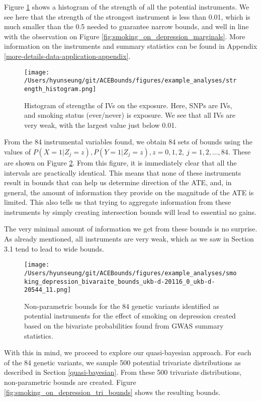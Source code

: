 \documentclass[
]{article}
\theoremstyle{plain}
\begin{document}
{Figure \ref{fig:strength_histogram} shows a histogram of the strength of all the potential instruments. We see here that the strength of the strongest instrument is less than 0.01, which is much smaller than the 0.5 needed to guarantee narrow bounds, and well in line with the observation on Figure \ref{fig:smoking_on_depression_marginals}. More information on the instruments and summary statistics can be found in Appendix \ref{more-details-data-application-appendix}.

\begin{figure}[H]
  \center
  \texttt{[image: /Users/hyunseung/git/ACEBounds/figures/example\_analyses/strength\_histogram.png]}
  \caption{Histogram of strengths of IVs on the exposure. Here, SNPs are IVs, and smoking status (ever/never) is exposure. We see that all IVs are very weak, with the largest value just below 0.01.}
  \label{fig:strength_histogram}
\end{figure}

From the 84 instrumental variables found, we obtain 84 sets of bounds using the values of \(P(X = 1 | Z_j = z), P(Y = 1 | Z_j = z), z = 0,1,2,\ j=1,2,...,84\). These are shown on Figure \ref{fig:smoking_on_depression_ind_bounds}. From this figure, it is immediately clear that all the intervals are practically identical. This means that none of these instruments result in bounds that can help us determine direction of the ATE, and, in general, the amount of information they provide on the magnitude of the ATE is limited. This also tells us that trying to aggregate information from these instruments by simply creating intersection bounds will lead to essential no gains.

The very minimal amount of information we get from these bounds is no surprise. As already mentioned, all instruments are very weak, which as we saw in Section 3.1 tend to lead to wide bounds.

\begin{figure}[H]
  \texttt{[image: /Users/hyunseung/git/ACEBounds/figures/example\_analyses/smoking\_depression\_bivaraite\_bounds\_ukb-d-20116\_0\_ukb-d-20544\_11.png]}
  \caption{Non-parametric bounds for the 84 genetic variants identified as potential instruments for the effect of smoking on depression created based on the bivariate probabilities found from GWAS summary statistics.}
  \label{fig:smoking_on_depression_ind_bounds}
\end{figure}

With this in mind, we proceed to explore our quasi-bayesian approach. For each of the 84 genetic variants, we sample 500 potential trivariate distributions as described in Section \ref{quasi-bayesian}. From these 500 trivariate distributions, non-parametric bounds are created. Figure \ref{fig:smoking_on_depression_tri_bounds} shows the resulting bounds.

}
\end{document}

